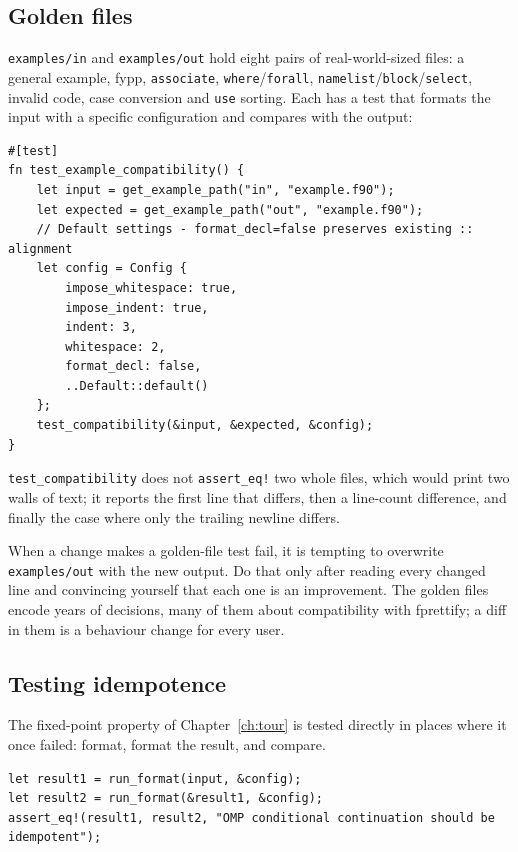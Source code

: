 \documentclass[11pt,a4paper,openany]{book}
\newcommand{\code}[1]{\texttt{\small #1}}
\newcommand{\file}[1]{\texttt{\small\color{accent}#1}}
\begin{document}
\subsection{Golden files}

\file{examples/in} and \file{examples/out} hold eight pairs of real-world-sized
files: a general example, fypp, \code{associate}, \code{where}/\code{forall},
\code{namelist}/\code{block}/\code{select}, invalid code, case conversion
and \code{use} sorting. Each has a test that formats the input with a specific
configuration and compares with the output:

\begin{lstlisting}[style=rust]
#[test]
fn test_example_compatibility() {
    let input = get_example_path("in", "example.f90");
    let expected = get_example_path("out", "example.f90");
    // Default settings - format_decl=false preserves existing :: alignment
    let config = Config {
        impose_whitespace: true,
        impose_indent: true,
        indent: 3,
        whitespace: 2,
        format_decl: false,
        ..Default::default()
    };
    test_compatibility(&input, &expected, &config);
}
\end{lstlisting}

\code{test\_compatibility} does not \code{assert\_eq!} two whole files, which
would print two walls of text; it reports the first line that differs,
then a line-count difference, and finally the case where only the trailing
newline differs.

\begin{pitfall}
When a change makes a golden-file test fail, it is tempting to overwrite
\file{examples/out} with the new output. Do that only after reading every
changed line and convincing yourself that each one is an improvement. The
golden files encode years of decisions, many of them about compatibility with
fprettify; a diff in them is a behaviour change for every user.
\end{pitfall}

\subsection{Testing idempotence}

The fixed-point property of Chapter~\ref{ch:tour} is tested directly in places
where it once failed: format, format the result, and compare.

\begin{lstlisting}[style=rust]
let result1 = run_format(input, &config);
let result2 = run_format(&result1, &config);
assert_eq!(result1, result2, "OMP conditional continuation should be idempotent");
\end{lstlisting}
\end{document}
